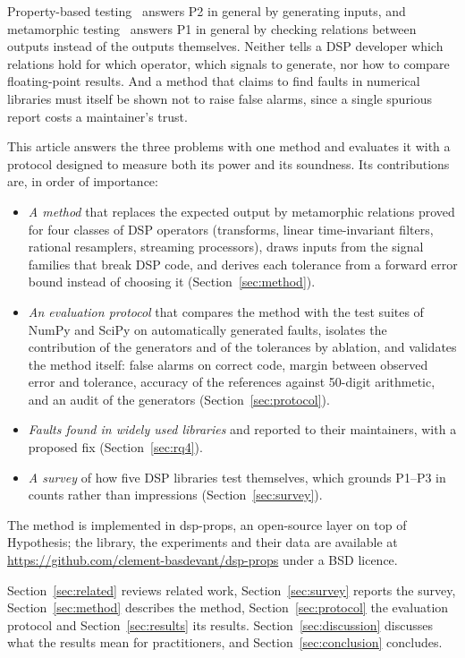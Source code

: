 \documentclass[10pt,conference]{IEEEtran}
\begin{document}
Property-based testing~\cite{claessen2000quickcheck,maciver2019hypothesis}
answers P2 in general by generating inputs, and metamorphic
testing~\cite{chen2018metamorphic,segura2016metamorphic} answers P1 in general
by checking relations between outputs instead of the outputs themselves.
Neither tells a DSP developer which relations hold for which operator, which
signals to generate, nor how to compare floating-point results. And a method
that claims to find faults in numerical libraries must itself be shown not to
raise false alarms, since a single spurious report costs a maintainer's trust.

This article answers the three problems with one method and evaluates it with a
protocol designed to measure both its power and its soundness. Its
contributions are, in order of importance:
\begin{itemize}
\item \emph{A method} that replaces the expected output by metamorphic relations
proved for four classes of DSP operators (transforms, linear time-invariant
filters, rational resamplers, streaming processors), draws inputs from the
signal families that break DSP code, and derives each tolerance from a
forward error bound instead of choosing it (Section~\ref{sec:method}).
\item \emph{An evaluation protocol} that compares the method with the test
suites of NumPy and SciPy on automatically generated faults, isolates the
contribution of the generators and of the tolerances by ablation, and validates
the method itself: false alarms on correct code, margin between observed error
and tolerance, accuracy of the references against 50-digit arithmetic, and an
audit of the generators (Section~\ref{sec:protocol}).
\item \emph{Faults found in widely used libraries} and reported to their
maintainers, with a proposed fix (Section~\ref{sec:rq4}).
\item \emph{A survey} of how five DSP libraries test themselves, which grounds
P1--P3 in counts rather than impressions (Section~\ref{sec:survey}).
\end{itemize}
The method is implemented in dsp-props, an open-source layer on top of
Hypothesis; the library, the experiments and their data are available at
\url{https://github.com/clement-basdevant/dsp-props} under a BSD licence.

Section~\ref{sec:related} reviews related work, Section~\ref{sec:survey}
reports the survey, Section~\ref{sec:method} describes the method,
Section~\ref{sec:protocol} the evaluation protocol and Section~\ref{sec:results}
its results. Section~\ref{sec:discussion} discusses what the results mean for
practitioners, and Section~\ref{sec:conclusion} concludes.
\end{document}
